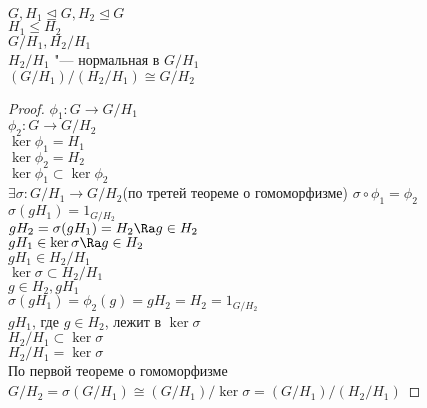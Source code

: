\begin{theorem}
$G, H_1 \unlhd G, H_2 \unlhd G$\\
$H_1 \le H_2$\\
$G/H_1, H_2 / H_1$\\
$H_2 / H_1$  "--- нормальная в $G / H_1$\\
$(G / H_1)/(H_2 / H_1) \cong G / H_2$\\
\end{theorem}
\begin{proof}
$\phi_1 \colon G \to G / H_1$\\
$\phi_2 \colon G \to G / H_2$\\
$\ker \phi_1 = H_1$\\
$\ker \phi_2 = H_2$\\
$\ker \phi_1 \subset \ker \phi_2$\\
$\exists \sigma \colon G / H_1 \to G / H_2$(по третей теореме о гомоморфизме)
$\sigma \circ \phi_1 = \phi_2$\\
$\sigma(gH_1) = 1_{G / H_2}$\\
$gH_2 = \sigma(gH_1) = H_2 \Ra g \in H_2$\\

$gH_1 \in \ker \sigma \Ra g \in H_2$\\
$gH_1 \in H_2 / H_1$\\
$\ker \sigma \subset H_2 / H_1$\\

$g \in H_2, gH_1$\\
$\sigma(gH_1) = \phi_2(g) = gH_2 = H_2 = 1_{G/ H_2}$\\
$gH_1$, где $g \in H_2$, лежит в $\ker \sigma$\\
$H_2 / H_1 \subset \ker \sigma$\\
$H_2 / H_1 = \ker \sigma$\\

По первой теореме о гомоморфизме 
$G / H_2 = \sigma (G / H_1) \cong (G / H_1)/ \ker \sigma = (G/ H_1)/(H_2 / H_1)$

\end{proof}
